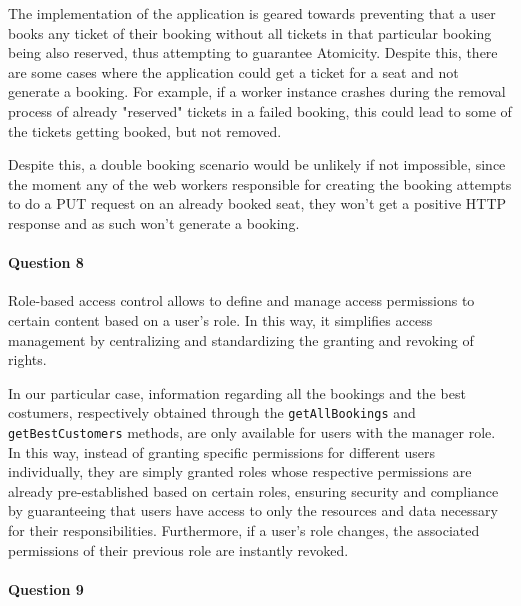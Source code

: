 \documentclass{ds-report}
\begin{document}
The implementation of the application is geared towards preventing that a user books any ticket of their booking without all tickets in that particular booking being also reserved, thus attempting to guarantee Atomicity. Despite this, there are some cases where the application could get a ticket for a seat and not generate a booking. For example, if a worker instance crashes during the removal process of already "reserved" tickets in a failed booking, this could lead to some of the tickets getting booked, but not removed.

Despite this, a double booking scenario would be unlikely if not impossible, since the moment any of the web workers responsible for creating the booking attempts to do a PUT request on an already booked seat, they won't get a positive HTTP response and as such won't generate a booking.

    \paragraph{Question 8}
Role-based access control allows to define and manage access permissions to certain content based on a user’s role. In this way, it simplifies access management by centralizing and standardizing the granting and revoking of rights.
    
In our particular case, information regarding all the bookings and the best costumers, respectively obtained through the \texttt{getAllBookings} and \texttt{getBestCustomers} methods, are only available for users with the manager role. In this way, instead of granting specific permissions for different users individually, they are simply granted roles whose respective permissions are already pre-established based on certain roles, ensuring security and compliance by guaranteeing that users have access to only the resources and data necessary for their responsibilities. Furthermore, if a user's role changes, the associated permissions of their previous role are instantly revoked.

    \paragraph{Question 9} 
\end{document}

